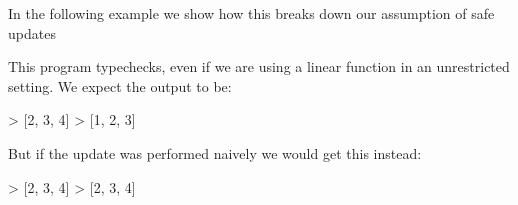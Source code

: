 \documentclass[
]{article}
\newenvironment{Shaded}{}{}
\newcommand{\CommentTok}[1]{\textcolor[rgb]{0.38,0.63,0.69}{\textit{#1}}}
\newcommand{\DataTypeTok}[1]{\textcolor[rgb]{0.56,0.13,0.00}{#1}}
\newcommand{\DecValTok}[1]{\textcolor[rgb]{0.25,0.63,0.44}{#1}}
\newcommand{\FunctionTok}[1]{\textcolor[rgb]{0.02,0.16,0.49}{#1}}
\newcommand{\KeywordTok}[1]{\textcolor[rgb]{0.00,0.44,0.13}{\textbf{#1}}}
\newcommand{\NormalTok}[1]{#1}
\newcommand{\OperatorTok}[1]{\textcolor[rgb]{0.40,0.40,0.40}{#1}}
\newcommand{\OtherTok}[1]{\textcolor[rgb]{0.00,0.44,0.13}{#1}}
\begin{document}
In the following example we show how this breaks down our assumption of
safe updates

\begin{Shaded}
\end{Shaded}

This program typechecks, even if we are using a linear function in an
unrestricted setting. We expect the output to be:

\begin{Shaded}
\begin{Highlighting}[]
\OperatorTok{\textgreater{}}\NormalTok{ [}\DecValTok{2}\NormalTok{, }\DecValTok{3}\NormalTok{, }\DecValTok{4}\NormalTok{]}
\OperatorTok{\textgreater{}}\NormalTok{ [}\DecValTok{1}\NormalTok{, }\DecValTok{2}\NormalTok{, }\DecValTok{3}\NormalTok{]}
\end{Highlighting}
\end{Shaded}

But if the update was performed naively we would get this instead:

\begin{Shaded}
\begin{Highlighting}[]
\OperatorTok{\textgreater{}}\NormalTok{ [}\DecValTok{2}\NormalTok{, }\DecValTok{3}\NormalTok{, }\DecValTok{4}\NormalTok{]}
\OperatorTok{\textgreater{}}\NormalTok{ [}\DecValTok{2}\NormalTok{, }\DecValTok{3}\NormalTok{, }\DecValTok{4}\NormalTok{]}
\end{Highlighting}
\end{Shaded}
\end{document}
